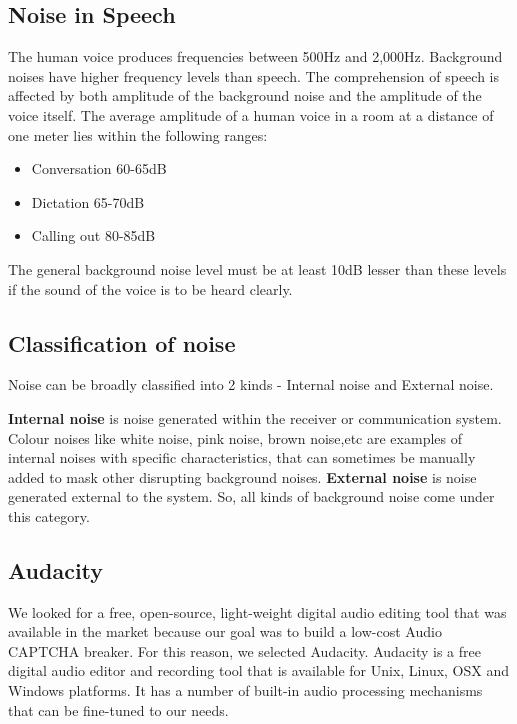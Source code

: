 \subsection{Noise in Speech}
The human voice produces frequencies between 500Hz and 2,000Hz. Background noises have higher frequency levels than speech. The comprehension of speech is affected by both amplitude of the background noise and the amplitude of the voice itself. The average amplitude of a human voice in a room at a distance of one meter lies within the following ranges:
\begin{itemize}
\item Conversation	60-65dB
\item Dictation	65-70dB
\item Calling out	80-85dB 
\end{itemize}
The general background noise level must be at least 10dB lesser than these levels if the sound of the voice is to be heard clearly.\newline

\subsection{Classification of noise}
Noise can be broadly classified into 2 kinds - Internal noise and External noise.\newline

\textbf{Internal noise} is noise generated within the receiver or communication system. Colour noises like white noise, pink noise, brown noise,etc are examples of internal noises with specific characteristics, that can sometimes be manually added to mask other disrupting background noises. \textbf{External noise} is noise generated external to the system. So, all kinds of background noise come under this category.\newline

\subsection{Audacity}
We looked for a free, open-source, light-weight digital audio editing tool that was available in the market because our goal was to build a low-cost Audio CAPTCHA breaker. For this reason, we selected Audacity. Audacity is a free digital audio editor and recording tool that is available for Unix, Linux, OSX and Windows platforms. It has a number of built-in audio processing mechanisms that can be fine-tuned to our needs.\newline

